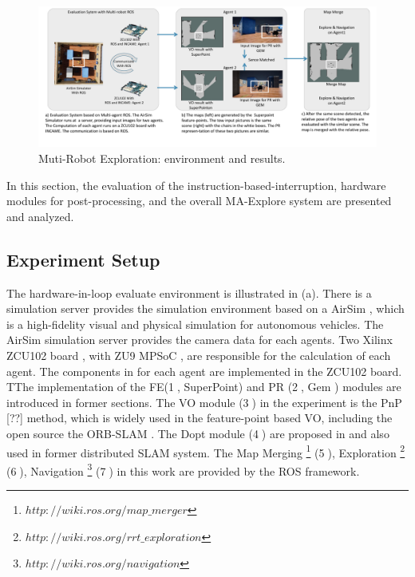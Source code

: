 \label{sec:experiments}


\begin{figure}[t]
  \centering
  \includegraphics[width=0.9\linewidth]{fig/env.pdf}
  \caption{Muti-Robot Exploration: environment and results. }
  \label{fig:env}
\end{figure}

In this section, the evaluation of the instruction-based-interruption, hardware modules for post-processing, and the overall MA-Explore system are presented and analyzed.

\subsection{ Experiment Setup }

The hardware-in-loop evaluate environment is illustrated in (a). There is a simulation server provides the simulation environment based on a AirSim \cite{shah2018airsim}, which is a high-fidelity visual and physical simulation for autonomous vehicles. The AirSim simulation server provides the camera data for each agents. Two Xilinx ZCU102 board \cite{zcu102}, with ZU9 MPSoC \cite{MPSoC}, are responsible for the calculation of each agent. 
The components in  for each agent are implemented in the ZCU102 board. TThe implementation of the FE(\textcircled{1}, SuperPoint\cite{detone2018superpoint}) and PR (\textcircled{2}, Gem \cite{radenovic2018fine}) modules are introduced in former sections. 
The VO module (\textcircled{3}) in the experiment is the PnP [??] method, which is widely used in the feature-point based VO, including the open source the ORB-SLAM \cite{Mur-Artal:2017281}. 
The Dopt module (\textcircled{4}) are proposed in \cite{Choudhary:2017e66} and also used in former distributed SLAM system\cite{cieslewski2018data}. 
The Map Merging \footnote{$http://wiki.ros.org/map\_merger$} (\textcircled{5}), Exploration \footnote{$http://wiki.ros.org/rrt\_exploration$} (\textcircled{6}), Navigation \footnote{$http://wiki.ros.org/navigation$} (\textcircled{7}) in this work are provided by the ROS framework. 


